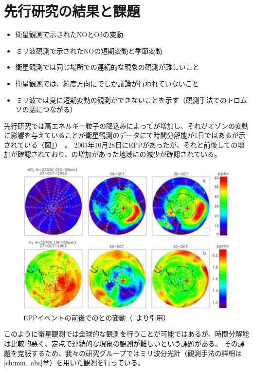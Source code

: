 \section{先行研究の結果と課題}
\label{sec:intro_privious}
\begin{itemize}
    \item 衛星観測で示されたNOとO3の変動
    \item ミリ波観測で示されたNOの短期変動と季節変動
    \item 衛星観測では同じ場所での連続的な現象の観測が難しいこと
    \item 衛星観測では、緯度方向にでしか議論が行われていないこと
    \item ミリ波では夏に短期変動の観測ができないことを示す（観測手法でのトロムソの話につながる）
\end{itemize}
先行研究では高エネルギー粒子の降込みによってが増加し、それがオゾンの変動に影響を与えていることが衛星観測のデータにて時間分解能が1日ではあるが示されている（図\ref{fig:lopez2005observation_fig3}）~\cite{lopez2005observation}。
2003年10月28日にEPPがあったが、それと前後しての増加が確認されており、の増加があった地域にの減少が確認されている。
\begin{figure}[htbp]
    \centering
    \includegraphics[width=\linewidth]{master_thesis_contents/master_thesis_fig/lopez2005observation_fig3.pdf}
    \caption{EPPイベントの前後でのとの変動（~\cite{lopez2005observation}より引用）}
    \label{fig:lopez2005observation_fig3}
\end{figure}
このように衛星観測では全球的な観測を行うことが可能ではあるが、時間分解能は比較的悪く、定点で連続的な現象の観測が難しいという課題がある。
その課題を克服するため、我々の研究グループではミリ波分光計（観測手法の詳細は\ref{ch:mm_obs}章）を用いた観測を行っている。



